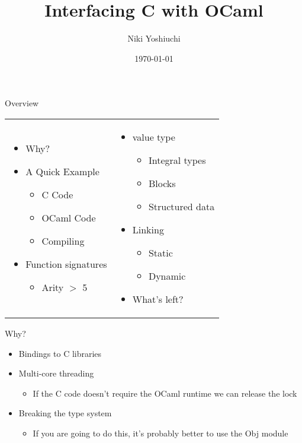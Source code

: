 \documentclass{beamer}
\title{Interfacing C with OCaml}
\author{Niki Yoshiuchi}
\date{\today}
\begin{document}
\begin{frame}[plain]
    \titlepage
\end{frame}

\begin{frame}{Overview}
\begin{tabular}{p{}p{}}
\begin{itemize}
    \item Why?
    \item A Quick Example
    \begin{itemize}
        \item C Code
        \item OCaml Code
        \item Compiling
    \end{itemize}
    \item Function signatures
    \begin{itemize}
        \item Arity $>$ 5
    \end{itemize}
\end{itemize} &

\begin{itemize}
    \item value type
    \begin{itemize}
        \item Integral types
        \item Blocks
        \item Structured data
    \end{itemize}
    \item Linking
    \begin{itemize}
        \item Static
        \item Dynamic
    \end{itemize}
    \item What's left?
\end{itemize} \\
\end{tabular}
\end{frame}

\begin{frame}{Why?}
\begin{itemize}
    \item Bindings to C libraries
    \item Multi-core threading
    \begin{itemize}
        \item If the C code doesn't require the OCaml runtime we can release the lock
    \end{itemize}
    \item Breaking the type system
    \begin{itemize}
        \item If you are going to do this, it's probably better to use the Obj module
    \end{itemize}
\end{itemize}
\end{frame}
\end{document}
